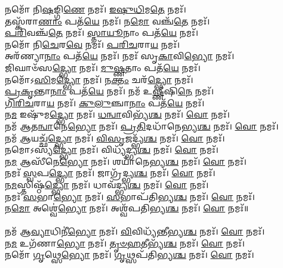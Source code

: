 𑌨𑌮𑍋᳴ 𑌨𑌿\-\ul{𑌷}\-𑌙𑍍𑌗𑌿\-\ul{𑌣𑍇} 𑌨𑌮𑌃᳴। \ul{𑌇}\-\-\ul{𑌷𑍁}\-\-\ul{𑌧𑌿}\-𑌮\-\ul{𑌤𑍇} 𑌨𑌮𑌃᳴। \\
𑌤𑌸𑍍𑌕᳴𑌰𑌾\-\ul{𑌣𑌾𑌂} 𑌪𑌤᳴\-\ul{𑌯𑍇} 𑌨𑌮𑌃᳴। 𑌨\-\ul{𑌮𑍋} 𑌵𑌞𑍍𑌚᳴\-\ul{𑌤𑍇} 𑌨𑌮𑌃᳴। \\
\-\ul{𑌪}\-\-\ul{𑌰𑌿}\-𑌵𑌞𑍍𑌚᳴\-\ul{𑌤𑍇} 𑌨𑌮𑌃᳴। \ul{𑌸𑍍𑌤𑌾}\-\-\ul{𑌯𑍂}\-𑌨𑌾𑌂 𑌪𑌤᳴\-\ul{𑌯𑍇} 𑌨𑌮𑌃᳴। \\
𑌨𑌮𑍋᳴ 𑌨𑌿\-\ul{𑌚𑍇}\-𑌰\-\ul{𑌵𑍇} 𑌨𑌮𑌃᳴। \ul{𑌪}\-\-\ul{𑌰𑌿}\-\-\ul{𑌚}\-𑌰𑌾\-\ul{𑌯} 𑌨𑌮𑌃᳴। \\
𑌅𑌰᳴𑌣𑍍𑌯𑌾\-\ul{𑌨𑌾𑌂} 𑌪𑌤᳴\-\ul{𑌯𑍇} 𑌨𑌮𑌃᳴। 𑌨𑌮𑌃᳴ 𑌸𑍃\-\ul{𑌕𑌾}\-𑌵𑌿\-\ul{𑌭𑍍𑌯𑍋} 𑌨𑌮𑌃᳴। \\
𑌜𑌿𑌘𑌾𑍞᳴𑌸\-\ul{𑌦𑍍𑌭𑍍𑌯𑍋} 𑌨𑌮𑌃᳴। \ul{𑌮𑍁}\-\-\ul{𑌷𑍍𑌣}\-𑌤𑌾𑌂 𑌪𑌤᳴\-\ul{𑌯𑍇} 𑌨𑌮𑌃᳴। \\
𑌨𑌮𑍋᳴𑌽\-\ul{𑌸𑌿}\-𑌮\-\ul{𑌦𑍍𑌭𑍍𑌯𑍋} 𑌨𑌮𑌃᳴। 𑌨\-\ul{𑌕𑍍𑌤𑌂} 𑌚𑌰᳴\-\ul{𑌦𑍍𑌭𑍍𑌯𑍋} 𑌨𑌮𑌃᳴। \\
\-\ul{𑌪𑍍𑌰}\-\-\ul{𑌕𑍃}\-𑌨𑍍𑌤𑌾\-\ul{𑌨𑌾𑌂} 𑌪𑌤᳴\-\ul{𑌯𑍇} 𑌨𑌮𑌃᳴। 𑌨𑌮᳴ 𑌉\-\ul{𑌷𑍍𑌣𑍀}\-𑌷𑌿\-\ul{𑌨𑍇} 𑌨𑌮𑌃᳴। \\
\-\ul{𑌗𑌿}\-\-\ul{𑌰𑌿}\-\-\ul{𑌚}\-𑌰𑌾\-\ul{𑌯} 𑌨𑌮𑌃᳴। \ul{𑌕𑍁}\-\-\ul{𑌲𑍁}\-𑌞𑍍𑌚𑌾\-\ul{𑌨𑌾𑌂} 𑌪𑌤᳴\-\ul{𑌯𑍇}  𑌨𑌮𑌃᳴। \\
𑌨\-\ul{𑌮} 𑌇𑌷𑍁᳴𑌮\-\ul{𑌦𑍍𑌭𑍍𑌯𑍋}  𑌨𑌮𑌃᳴। \ul{𑌧}\-\-\ul{𑌨𑍍𑌵𑌾}\-𑌵𑌿𑌭𑍍𑌯᳴\-\ul{𑌶𑍍𑌚}  𑌨𑌮𑌃᳴। \ul{𑌵𑍋}  𑌨𑌮𑌃᳴। \\
𑌨𑌮᳴ 𑌆𑌤\-\ul{𑌨𑍍𑌵𑌾}\-𑌨𑍇\-\ul{𑌭𑍍𑌯𑍋} 𑌨𑌮𑌃᳴। \ul{𑌪𑍍𑌰}\-\-\ul{𑌤𑌿}\-𑌦𑌧𑌾᳴𑌨𑍇𑌭𑍍𑌯\-\ul{𑌶𑍍𑌚}  𑌨𑌮𑌃᳴। \ul{𑌵𑍋} 𑌨𑌮𑌃᳴।\\
𑌨𑌮᳴ \ul{𑌆}\-𑌯𑌚𑍍𑌛᳴\-\ul{𑌦𑍍𑌭𑍍𑌯𑍋}  𑌨𑌮𑌃᳴।  \ul{𑌵𑌿}\-\-\ul{𑌸𑍃}\-𑌜𑌦𑍍𑌭𑍍𑌯᳴\-\ul{𑌶𑍍𑌚}  𑌨𑌮𑌃᳴।  \ul{𑌵𑍋} 𑌨𑌮𑌃᳴।\\
𑌨𑌮𑍋𑌽𑌸𑍍𑌯᳴\-\ul{𑌦𑍍𑌭𑍍𑌯𑍋}  𑌨𑌮𑌃᳴। 𑌵𑌿𑌧𑍍𑌯᳴𑌦𑍍𑌭𑍍𑌯\-\ul{𑌶𑍍𑌚}  𑌨𑌮𑌃᳴।  \ul{𑌵𑍋} 𑌨𑌮𑌃᳴।\\
𑌨\-\ul{𑌮} 𑌆𑌸𑍀᳴𑌨𑍇\-\ul{𑌭𑍍𑌯𑍋}  𑌨𑌮𑌃᳴। 𑌶𑌯𑌾᳴𑌨𑍇𑌭𑍍𑌯\-\ul{𑌶𑍍𑌚}  𑌨𑌮𑌃᳴। \ul{𑌵𑍋} 𑌨𑌮𑌃᳴।\\
𑌨𑌮𑌃᳴ \ul{𑌸𑍍𑌵}\-𑌪\-\ul{𑌦𑍍𑌭𑍍𑌯𑍋}  𑌨𑌮𑌃᳴। 𑌜𑌾𑌗𑍍𑌰᳴𑌦𑍍𑌭𑍍𑌯\-\ul{𑌶𑍍𑌚}  𑌨𑌮𑌃᳴।  \ul{𑌵𑍋} 𑌨𑌮𑌃᳴।\\
𑌨\-\ul{𑌮}\-𑌸𑍍𑌤𑌿𑌷𑍍𑌠᳴\-\ul{𑌦𑍍𑌭𑍍𑌯𑍋}  𑌨𑌮𑌃᳴। 𑌧𑌾𑌵᳴𑌦𑍍𑌭𑍍𑌯\-\ul{𑌶𑍍𑌚}  𑌨𑌮𑌃᳴।  \ul{𑌵𑍋} 𑌨𑌮𑌃᳴।\\
𑌨𑌮𑌃᳴ \ul{𑌸}\-𑌭𑌾\-\ul{𑌭𑍍𑌯𑍋}  𑌨𑌮𑌃᳴। \ul{𑌸}\-𑌭𑌾𑌪᳴𑌤𑌿𑌭𑍍𑌯\-\ul{𑌶𑍍𑌚} 𑌨𑌮𑌃᳴। \ul{𑌵𑍋} 𑌨𑌮𑌃᳴।\\
𑌨\-\ul{𑌮𑍋} 𑌅𑌶𑍍𑌵𑍇॑\-\ul{𑌭𑍍𑌯𑍋}  𑌨𑌮𑌃᳴। 𑌅𑌶𑍍𑌵᳴𑌪𑌤𑌿𑌭𑍍𑌯\-\ul{𑌶𑍍𑌚}  𑌨𑌮𑌃᳴। \ul{𑌵𑍋} 𑌨𑌮𑌃᳴॥\\
\\
𑌨𑌮᳴ 𑌆\-\ul{𑌵𑍍𑌯𑌾}\-𑌧𑌿𑌨𑍀॑\-\ul{𑌭𑍍𑌯𑍋}  𑌨𑌮𑌃᳴। \ul{𑌵𑌿}\-𑌵𑌿𑌧𑍍𑌯᳴𑌨𑍍𑌤𑍀𑌭𑍍𑌯\-\ul{𑌶𑍍𑌚}  𑌨𑌮𑌃᳴।  \ul{𑌵𑍋} 𑌨𑌮𑌃᳴। \\
𑌨\-\ul{𑌮} 𑌉𑌗᳴𑌣𑌾\-\ul{𑌭𑍍𑌯𑍋} 𑌨𑌮𑌃᳴। \ul{𑌤𑍃}\-\-\ul{𑍞}\-\-\ul{𑌹}\-𑌤𑍀𑌭𑍍𑌯᳴\-\ul{𑌶𑍍𑌚} 𑌨𑌮𑌃᳴। \ul{𑌵𑍋} 𑌨𑌮𑌃᳴। \\
𑌨𑌮𑍋᳴ \ul{𑌗𑍃}\-𑌥𑍍𑌸𑍇\-\ul{𑌭𑍍𑌯𑍋} 𑌨𑌮𑌃᳴। \ul{𑌗𑍃}\-𑌥𑍍𑌸𑌪᳴𑌤𑌿𑌭𑍍𑌯\-\ul{𑌶𑍍𑌚} 𑌨𑌮𑌃᳴। \ul{𑌵𑍋} 𑌨𑌮𑌃᳴। \\
